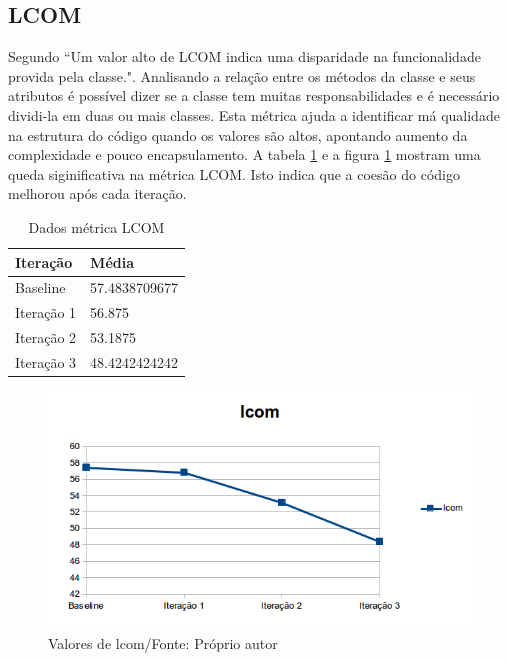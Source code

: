 \subsection{LCOM}

Segundo  ``Um valor alto de LCOM indica uma disparidade na
funcionalidade provida pela classe.". Analisando a relação entre os métodos da
classe e seus atributos é possível dizer se a classe tem muitas
responsabilidades e é necessário dividi-la em duas ou mais classes. Esta métrica
ajuda a identificar má qualidade na estrutura do código quando os valores são
altos, apontando aumento da complexidade e pouco encapsulamento. A tabela
\ref{tab:lcom} e a figura \ref{fig:lcom} mostram uma queda siginificativa na
métrica LCOM. Isto indica que a coesão do código melhorou após cada iteração.

\begin{table}[h]
	\centering
	    \caption{Dados métrica LCOM}
    \begin{tabular}{ | l | l | }
    \hline
    Iteração & Média 			\\ \hline
    Baseline & 57.4838709677   	\\ \hline
    Iteração 1 & 56.875			\\ \hline
	Iteração 2 & 53.1875		\\ \hline
	Iteração 3 & 48.4242424242	\\ \hline
    \end{tabular}
    \label{tab:lcom}
\end{table}

\begin{figure}[h]
	\centering
	\includegraphics{img/lcom.png}
	\caption{Valores de lcom/Fonte: Próprio autor}
	\label{fig:lcom}
\end{figure}
